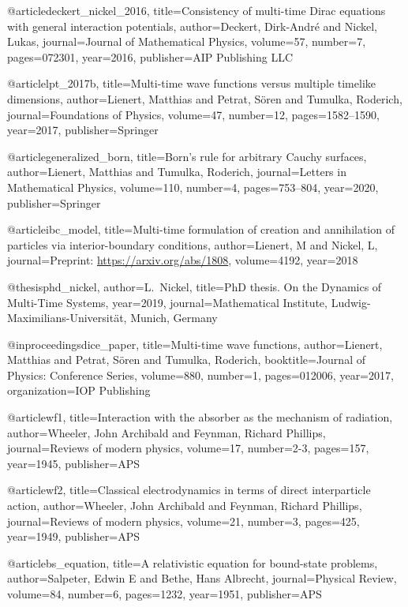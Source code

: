 @article{deckert_nickel_2016,
  title={Consistency of multi-time Dirac equations with general interaction potentials},
  author={Deckert, Dirk-Andr{\'e} and Nickel, Lukas},
  journal={Journal of Mathematical Physics},
  volume={57},
  number={7},
  pages={072301},
  year={2016},
  publisher={AIP Publishing LLC}
}

@article{lpt_2017b,
  title={Multi-time wave functions versus multiple timelike dimensions},
  author={Lienert, Matthias and Petrat, S{\"o}ren and Tumulka, Roderich},
  journal={Foundations of Physics},
  volume={47},
  number={12},
  pages={1582--1590},
  year={2017},
  publisher={Springer}
}

@article{generalized_born,
  title={Born’s rule for arbitrary Cauchy surfaces},
  author={Lienert, Matthias and Tumulka, Roderich},
  journal={Letters in Mathematical Physics},
  volume={110},
  number={4},
  pages={753--804},
  year={2020},
  publisher={Springer}
}

@article{ibc_model,
  title={Multi-time formulation of creation and annihilation of particles via interior-boundary conditions},
  author={Lienert, M and Nickel, L},
  journal={Preprint: \url{https://arxiv.org/abs/1808}},
  volume={4192},
  year={2018}
}

@thesis{phd_nickel,
author={L.~Nickel},
title={PhD thesis. On the Dynamics of Multi-Time Systems},
year={2019},
journal={Mathematical Institute, Ludwig-Maximilians-Universit\"at, Munich,
  Germany}
}

@inproceedings{dice_paper,
  title={Multi-time wave functions},
  author={Lienert, Matthias and Petrat, S{\"o}ren and Tumulka, Roderich},
  booktitle={Journal of Physics: Conference Series},
  volume={880},
  number={1},
  pages={012006},
  year={2017},
  organization={IOP Publishing}
}

@article{wf1,
  title={Interaction with the absorber as the mechanism of radiation},
  author={Wheeler, John Archibald and Feynman, Richard Phillips},
  journal={Reviews of modern physics},
  volume={17},
  number={2-3},
  pages={157},
  year={1945},
  publisher={APS}
}

@article{wf2,
  title={Classical electrodynamics in terms of direct interparticle action},
  author={Wheeler, John Archibald and Feynman, Richard Phillips},
  journal={Reviews of modern physics},
  volume={21},
  number={3},
  pages={425},
  year={1949},
  publisher={APS}
}

@article{bs_equation,
  title={A relativistic equation for bound-state problems},
  author={Salpeter, Edwin E and Bethe, Hans Albrecht},
  journal={Physical Review},
  volume={84},
  number={6},
  pages={1232},
  year={1951},
  publisher={APS}
}

